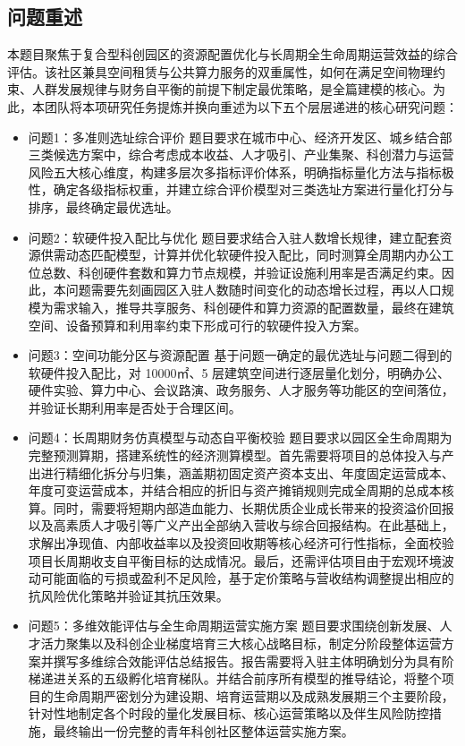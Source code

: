 \documentclass[12pt,a4paper]{article}
\begin{document}
\subsection{问题重述}
本题目聚焦于复合型科创园区的资源配置优化与长周期全生命周期运营效益的综合评估。该社区兼具空间租赁与公共算力服务的双重属性，如何在满足空间物理约束、人群发展规律与财务自平衡的前提下制定最优策略，是全篇建模的核心。为此，本团队将本项研究任务提炼并换向重述为以下五个层层递进的核心研究问题：\\
\begin{itemize}
    \item {问题1：}多准则选址综合评价
题目要求在城市中心、经济开发区、城乡结合部三类候选方案中，综合考虑成本收益、人才吸引、产业集聚、科创潜力与运营风险五大核心维度，构建多层次多指标评价体系，明确指标量化方法与指标极性，确定各级指标权重，并建立综合评价模型对三类选址方案进行量化打分与排序，最终确定最优选址。\\
    \item {问题2：}软硬件投入配比与优化
题目要求结合入驻人数增长规律，建立配套资源供需动态匹配模型，计算并优化软硬件投入配比，同时测算全周期内办公工位总数、科创硬件套数和算力节点规模，并验证设施利用率是否满足约束。因此，本问题需要先刻画园区入驻人数随时间变化的动态增长过程，再以人口规模为需求输入，推导共享服务、科创硬件和算力资源的配置数量，最终在建筑空间、设备预算和利用率约束下形成可行的软硬件投入方案。\\
    \item {问题3：}空间功能分区与资源配置
基于问题一确定的最优选址与问题二得到的软硬件投入配比，对 10000㎡、5 层建筑空间进行逐层量化划分，明确办公、硬件实验、算力中心、会议路演、政务服务、人才服务等功能区的空间落位，并验证长期利用率是否处于合理区间。    
    \item{问题4：}长周期财务仿真模型与动态自平衡校验
题目要求以园区全生命周期为完整预测算期，搭建系统性的经济测算模型。首先需要将项目的总体投入与产出进行精细化拆分与归集，涵盖期初固定资产资本支出、年度固定运营成本、年度可变运营成本，并结合相应的折旧与资产摊销规则完成全周期的总成本核算。同时，需要将短期内部造血能力、长期优质企业成长带来的投资溢价回报以及高素质人才吸引等广义产出全部纳入营收与综合回报结构。在此基础上，求解出净现值、内部收益率以及投资回收期等核心经济可行性指标，全面校验项目长周期收支自平衡目标的达成情况。最后，还需评估项目由于宏观环境波动可能面临的亏损或盈利不足风险，基于定价策略与营收结构调整提出相应的抗风险优化策略并验证其抗压效果。\\
    \item{问题5：}多维效能评估与全生命周期运营实施方案
题目要求围绕创新发展、人才活力聚集以及科创企业梯度培育三大核心战略目标，制定分阶段整体运营方案并撰写多维综合效能评估总结报告。报告需要将入驻主体明确划分为具有阶梯递进关系的五级孵化培育梯队。并结合前序所有模型的推导结论，将整个项目的生命周期严密划分为建设期、培育运营期以及成熟发展期三个主要阶段，针对性地制定各个时段的量化发展目标、核心运营策略以及伴生风险防控措施，最终输出一份完整的青年科创社区整体运营实施方案。\\
\end{itemize}
\end{document}
